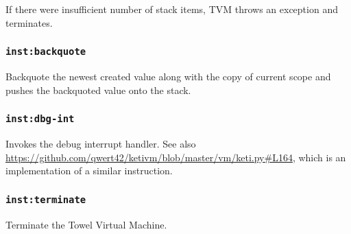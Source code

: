 \documentclass{article}
\newcommand{\inst}[1] {\texttt{inst:#1}}
\begin{document}
If there were insufficient number of stack items, TVM throws an exception and terminates.

\subsubsection{\inst{backquote}}

Backquote the newest created value along with the copy of current scope and pushes the backquoted value onto the stack.

\subsubsection{\inst{dbg-int}}

Invokes the debug interrupt handler. See also \url{https://github.com/qwert42/ketivm/blob/master/vm/keti.py#L164}, which is an implementation of a similar instruction.

\subsubsection{\inst{terminate}}

Terminate the Towel Virtual Machine.
\end{document}
